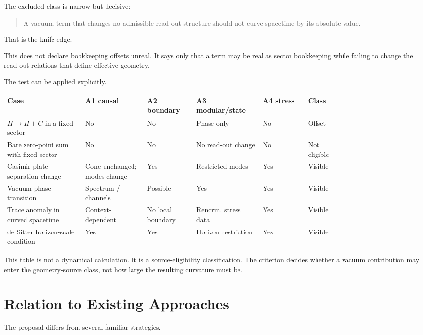 \documentclass[12pt,a4paper]{article}
\theoremstyle{definition}
\theoremstyle{remark}
\begin{document}
The excluded class is narrow but decisive:

\begin{quote}
A vacuum term that changes no admissible read-out structure should not curve spacetime by its absolute value.
\end{quote}

That is the knife edge.

This does not declare bookkeeping offsets unreal. It says only that a term may be real as sector bookkeeping while failing to change the read-out relations that define effective geometry.

The test can be applied explicitly.

\begin{center}
\begin{tabular}{P{0.19\linewidth}P{0.15\linewidth}P{0.12\linewidth}P{0.14\linewidth}P{0.11\linewidth}P{0.09\linewidth}}
\toprule
\textbf{Case} & \textbf{A1 causal} & \textbf{A2 boundary} & \textbf{A3 modular/state} & \textbf{A4 stress} & \textbf{Class} \\
\midrule
$H\to H+C$ in a fixed sector & No & No & Phase only & No & Offset \\
Bare zero-point sum with fixed sector & No & No & No read-out change & No & Not eligible \\
Casimir plate separation change & Cone unchanged; modes change & Yes & Restricted modes & Yes & Visible \\
Vacuum phase transition & Spectrum / channels & Possible & Yes & Yes & Visible \\
Trace anomaly in curved spacetime & Context-dependent & No local boundary & Renorm. stress data & Yes & Visible \\
de Sitter horizon-scale condition & Yes & Yes & Horizon restriction & Yes & Visible \\
\bottomrule
\end{tabular}
\end{center}

This table is not a dynamical calculation. It is a source-eligibility classification. The criterion decides whether a vacuum contribution may enter the geometry-source class, not how large the resulting curvature must be.

\section{Relation to Existing Approaches}
\label{sec:relation}

The proposal differs from several familiar strategies.
\end{document}
